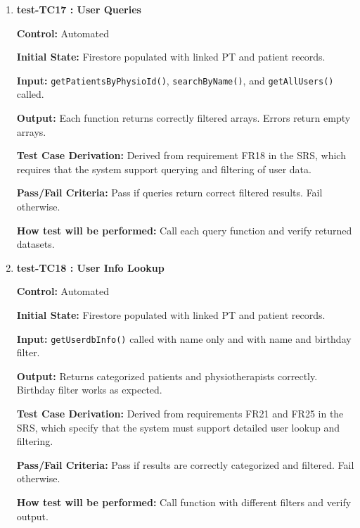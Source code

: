 \documentclass[12pt, titlepage]{article}
\begin{document}
\begin{enumerate}
  \textbf{How test will be performed:} Call \texttt{deleteUser()} with different inputs and verify outcomes.


  \vspace{0.5em}

  \item \textbf{test-TC17 : User Queries}

  \textbf{Control:} Automated

  \textbf{Initial State:} Firestore populated with linked PT and patient records.

  \textbf{Input:} \texttt{getPatientsByPhysioId()}, \texttt{searchByName()}, and \texttt{getAllUsers()} called.

  \textbf{Output:} Each function returns correctly filtered arrays. Errors return empty arrays.

  \textbf{Test Case Derivation:} Derived from requirement FR18 in the SRS, which requires that the system support querying and filtering of user data.

  \textbf{Pass/Fail Criteria:} Pass if queries return correct filtered results. Fail otherwise.

  \textbf{How test will be performed:} Call each query function and verify returned datasets.


  \vspace{0.5em}

  \item \textbf{test-TC18 : User Info Lookup}

  \textbf{Control:} Automated

  \textbf{Initial State:} Firestore populated with linked PT and patient records.

  \textbf{Input:} \texttt{getUserdbInfo()} called with name only and with name and birthday filter.

  \textbf{Output:} Returns categorized patients and physiotherapists correctly. Birthday filter works as expected.

  \textbf{Test Case Derivation:} Derived from requirements FR21 and FR25 in the SRS, which specify that the system must support detailed user lookup and filtering.

  \textbf{Pass/Fail Criteria:} Pass if results are correctly categorized and filtered. Fail otherwise.

  \textbf{How test will be performed:} Call function with different filters and verify output.


  \vspace{0.5em}


\end{enumerate}
\end{document}

